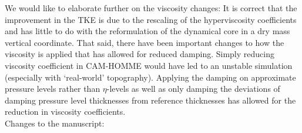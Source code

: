 \documentclass[11pt]{article}
\begin{document}
We would like to elaborate further on the viscosity changes: It is correct that the improvement in the TKE is due to the rescaling of the hyperviscosity coefficients and has little to do with the reformulation of the dynamical core in a dry mass vertical coordinate. That said, there have been important changes to how the viscosity is applied that has allowed for reduced damping. Simply reducing viscosity coefficient in CAM-HOMME would have led to an unstable simulation (especially with `real-world' topography). Applying the damping on approximate pressure levels rather than $\eta$-levels as well as only damping the deviations of damping pressure level thicknesses from reference thicknesses has allowed for the reduction in viscosity coefficients.\\

Changes to the manuscript: 
\end{document}
